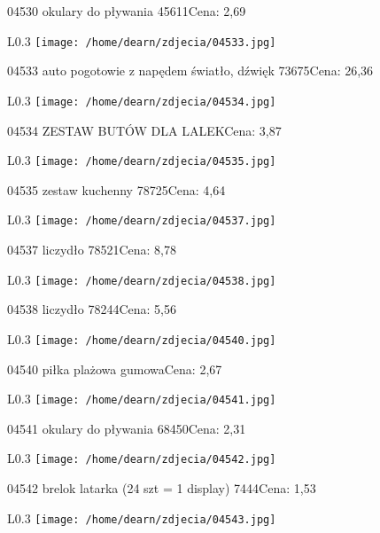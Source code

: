 04530 okulary do pływania 45611Cena: 2,69\newline
\begin{wrapfigure}{L}{0.3\textwidth}
\texttt{[image: /home/dearn/zdjecia/04533.jpg]}
\end{wrapfigure}
04533 auto pogotowie z napędem światło, dźwięk 73675Cena: 26,36\newline
\begin{wrapfigure}{L}{0.3\textwidth}
\texttt{[image: /home/dearn/zdjecia/04534.jpg]}
\end{wrapfigure}
04534 ZESTAW BUTÓW DLA LALEKCena: 3,87\newline
\begin{wrapfigure}{L}{0.3\textwidth}
\texttt{[image: /home/dearn/zdjecia/04535.jpg]}
\end{wrapfigure}
04535 zestaw kuchenny 78725Cena: 4,64\newline
\begin{wrapfigure}{L}{0.3\textwidth}
\texttt{[image: /home/dearn/zdjecia/04537.jpg]}
\end{wrapfigure}
04537 liczydło 78521Cena: 8,78\newline
\begin{wrapfigure}{L}{0.3\textwidth}
\texttt{[image: /home/dearn/zdjecia/04538.jpg]}
\end{wrapfigure}
04538 liczydło 78244Cena: 5,56\newline
\begin{wrapfigure}{L}{0.3\textwidth}
\texttt{[image: /home/dearn/zdjecia/04540.jpg]}
\end{wrapfigure}
04540 piłka plażowa gumowaCena: 2,67\newline
\begin{wrapfigure}{L}{0.3\textwidth}
\texttt{[image: /home/dearn/zdjecia/04541.jpg]}
\end{wrapfigure}
04541 okulary do pływania 68450Cena: 2,31\newline
\begin{wrapfigure}{L}{0.3\textwidth}
\texttt{[image: /home/dearn/zdjecia/04542.jpg]}
\end{wrapfigure}
04542 brelok latarka (24 szt = 1 display) 7444Cena: 1,53\newline
\begin{wrapfigure}{L}{0.3\textwidth}
\texttt{[image: /home/dearn/zdjecia/04543.jpg]}
\end{wrapfigure}
